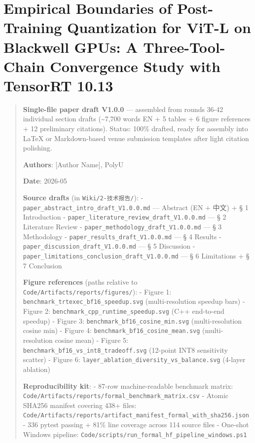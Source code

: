 \documentclass[
]{article}
\author{}
\date{}
\begin{document}
\section{Empirical Boundaries of Post-Training Quantization for ViT-L on
Blackwell GPUs: A Three-Tool-Chain Convergence Study with TensorRT
10.13}\label{empirical-boundaries-of-post-training-quantization-for-vit-l-on-blackwell-gpus-a-three-tool-chain-convergence-study-with-tensorrt-10.13}

\begin{quote}
\textbf{Single-file paper draft V1.0.0} --- assembled from rounds 36-42
individual section drafts (\textasciitilde7,700 words EN + 5 tables + 6
figure references + 12 preliminary citations). Status: 100\% drafted,
ready for assembly into LaTeX or Markdown-based venue submission
templates after light citation polishing.

\textbf{Authors}: {[}Author Name{]}, PolyU

\textbf{Date}: 2026-05

\textbf{Source drafts} (in \texttt{Wiki/2-技术报告/}): -
\texttt{paper\_abstract\_intro\_draft\_V1.0.0.md} --- Abstract (EN +
中文) + § 1 Introduction -
\texttt{paper\_literature\_review\_draft\_V1.0.0.md} --- § 2 Literature
Review - \texttt{paper\_methodology\_draft\_V1.0.0.md} --- § 3
Methodology - \texttt{paper\_results\_draft\_V1.0.0.md} --- § 4 Results
- \texttt{paper\_discussion\_draft\_V1.0.0.md} --- § 5 Discussion -
\texttt{paper\_limitations\_conclusion\_draft\_V1.0.0.md} --- § 6
Limitations + § 7 Conclusion

\textbf{Figure references} (paths relative to
\texttt{Code/Artifacts/reports/figures/}): - Figure 1:
\texttt{benchmark\_trtexec\_bf16\_speedup.svg} (multi-resolution speedup
bars) - Figure 2: \texttt{benchmark\_cpp\_runtime\_speedup.svg} (C++
end-to-end speedup) - Figure 3:
\texttt{benchmark\_bf16\_cosine\_min.svg} (multi-resolution cosine min)
- Figure 4: \texttt{benchmark\_bf16\_cosine\_mean.svg} (multi-resolution
cosine mean) - Figure 5:
\texttt{benchmark\_bf16\_vs\_int8\_tradeoff.svg} (12-point INT8
sensitivity scatter) - Figure 6:
\texttt{layer\_ablation\_diversity\_vs\_balance.svg} (4-layer ablation)

\textbf{Reproducibility kit}: - 87-row machine-readable benchmark
matrix: \texttt{Code/Artifacts/reports/formal\_benchmark\_matrix.csv} -
Atomic SHA256 manifest covering 438+ files:
\texttt{Code/Artifacts/reports/artifact\_manifest\_formal\_with\_sha256.json}
- 336 pytest passing + 81\% line coverage across 114 source files -
One-shot Windows pipeline:
\texttt{Code/scripts/run\_formal\_hf\_pipeline\_windows.ps1}
\end{quote}
\end{document}
